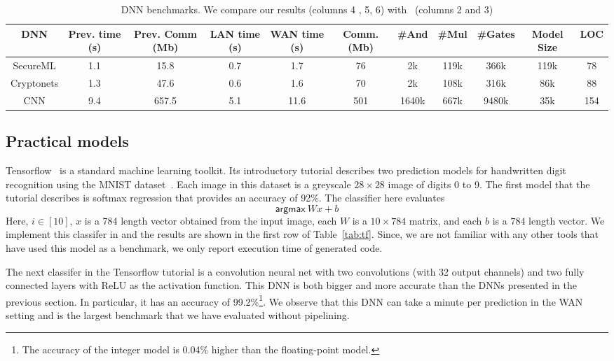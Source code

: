 \begin{table*}
\begin{tabular}{c|c|c|c |c|c|c|c|c|c|c}
DNN  & Prev. time (s) & Prev. Comm (Mb) & LAN time (s) & WAN time (s) & Comm. (Mb)  & \#And & \#Mul & \#Gates & Model Size & LOC\\
\hline
SecureML   &  1.1 & 15.8 & 0.7 & 1.7  & 76   &  2k   & 119k & 366k   & 119k & 78\\
\hline
Cryptonets &  1.3 & 47.6 & 0.6 & 1.6  & 70    & 2k    & 108k & 316k & 86k & 88\\
\hline
CNN        &  9.4 & 657.5& 5.1 & 11.6 & 501  & 1640k & 667k & 9480k & 35k & 154\\
\hline
\end{tabular}

 \caption{DNN benchmarks. We compare our results (columns 4 , 5, 6) with~\cite{minionn} (columns 2 and 3)}
 \label{tab:nn} 
\end{table*}


\subsection{Practical models}
Tensorflow~\cite{tensorflow} is a standard machine learning toolkit.
Its introductory tutorial describes two prediction models for handwritten digit recognition
using the MNIST dataset~\cite{mnist}.
Each image in this dataset is a greyscale $28\times 28$ image of digits 0 to 9.
The first model that the tutorial describes is softmax regression
that provides an accuracy of 92\%. The classifier here evaluates
\[
 \mathsf{argmax}\ Wx+b
\]
Here, $i\in [10]$, $x$ is a 784 length vector obtained from the input image,
each $W$ is a $10\times 784$ matrix, and each $b$ is a $784$ length vector. 
We implement this classifer in \tool and the results are shown in the first row of Table~\ref{tab:tf}.
Since, we are not familiar with any other tools that have used this model as a benchmark,
we only report execution time of \tool generated code.


The next classifer in the Tensorflow tutorial is a convolution neural net with two convolutions
(with 32 output channels) and two fully connected layers with ReLU as the activation function.
This DNN is both bigger and more accurate than the DNNs presented in the previous section.
In particular, it has an accuracy of 99.2\%\footnote{The accuracy of the integer model is 0.04\% higher than the floating-point model.}.
We observe that this DNN can take a minute per prediction in the WAN setting and is the largest
benchmark that we have evaluated without pipelining.


